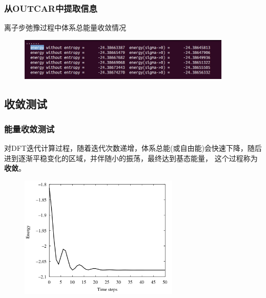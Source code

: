 {
	\frametitle{从\textrm{OUTCAR}中提取信息}
	离子步弛豫过程中体系总能量收敛情况%
\begin{figure}[h!]
\centering
\includegraphics[width=4.0in,viewport=0 0 680 130,clip]{Figures/Pt_FCC-OUTCAR_totene.png}
\caption{\fontsize{6.2pt}{5.2pt}}%
\label{Pt_FCC:OUTCAR_totene}
\end{figure}
{\fontsize{7.2pt}{5.2pt}}
}
\subsection{收敛测试}\label{Sec:convergence}
\frame
{
	\frametitle{能量收敛测试}
对\textrm{DFT}迭代计算过程，随着迭代次数递增，体系总能(或自由能)会快速下降，随后进到逐渐平稳变化的区域，并伴随小的振荡，最终达到基态能量，%
这个过程称为\textbf{收敛}。
\begin{figure}[h!]
	\vskip -5pt
\centering
\includegraphics[width=3.0in,viewport=0 33 740 600,clip]{Figures/Ab-initio-Ene.png}
\caption{\fontsize{6.2pt}{5.2pt}}%
\label{Fig:convergence}
\end{figure}
{\fontsize{7.0pt}{5.2pt}}
}

